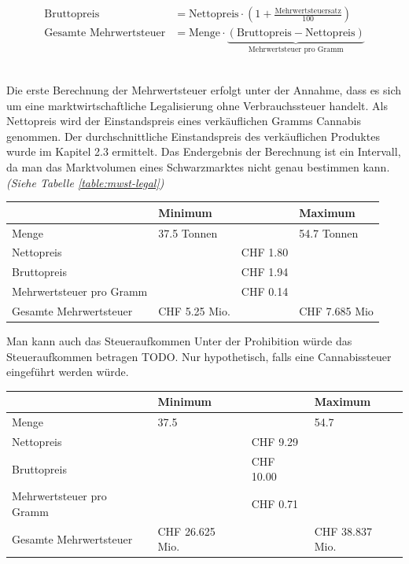 \documentclass[../main.tex]{subfiles}
\begin{document}
	 \noindent
	 \begin{align}
	 	 \text{Bruttopreis} &= \text{Nettopreis} \cdot \left( 1 + \frac{\text{Mehrwertsteuersatz}}{100} \right)\label{equ:brutto} \\[7pt]
	 	\text{Gesamte Mehrwertsteuer} &= \text{Menge} \cdot \underbrace{\left(\text{Bruttopreis} - \text{Nettopreis} \right)}_{\text{Mehrwertsteuer pro Gramm}} \label{equ:mwst} 
	 \end{align}
	 
	 \noindent\\
	 Die erste Berechnung der Mehrwertsteuer erfolgt unter der Annahme, dass es sich um eine marktwirtschaftliche Legalisierung ohne Verbrauchssteuer handelt.
	 Als Nettopreis wird der Einstandspreis eines verkäuflichen Gramms Cannabis genommen.
	 Der durchschnittliche Einstandspreis des verkäuflichen Produktes wurde im Kapitel 2.3 ermittelt.
	 Das Endergebnis der Berechnung ist ein Intervall, da man das Marktvolumen eines Schwarzmarktes nicht genau bestimmen kann. 
	 \textit{(Siehe Tabelle \ref{table:mwst-legal})}
	 
	 \noindent
	 \captionsetup{font=small}
	 \label{table:mwst-legal}
	 \begin{tabularx}{\textwidth}{X p{3.5cm} p{2.5cm} p{3.5cm}}
     	\toprule
     	\phantom{x} & Minimum & & Maximum \\
        \midrule
        Menge & 37.5 Tonnen & & 54.7 Tonnen\\
        \midrule
        Nettopreis & & CHF 1.80 & \\
        \midrule
        Bruttopreis & & CHF 1.94 & \\
        \midrule
        Mehrwertsteuer pro Gramm & & CHF 0.14 & \\
        \midrule
        Gesamte Mehrwertsteuer & CHF 5.25 Mio. & & CHF 7.685 Mio\\
        \bottomrule
     \end{tabularx}\pagebreak
     
     \noindent
     Man kann auch das Steueraufkommen 
     Unter der Prohibition würde das Steueraufkommen betragen TODO.
     Nur hypothetisch, falls eine Cannabissteuer eingeführt werden würde.\\
     
     \noindent
	 \begin{tabularx}{\textwidth}{X p{3.5cm} p{2.5cm} p{3.5cm}}
     	\toprule
     	\phantom{x} & Minimum & & Maximum \\
        \midrule
        Menge & 37.5 & & 54.7\\
        \midrule
        Nettopreis & & CHF 9.29 & \\
        \midrule
        Bruttopreis & & CHF 10.00 & \\
        \midrule
        Mehrwertsteuer pro Gramm & & CHF 0.71 & \\
        \midrule
        Gesamte Mehrwertsteuer & CHF 26.625 Mio. & & CHF 38.837 Mio.\\
        \bottomrule
     \end{tabularx}\\
	 
\end{document}
